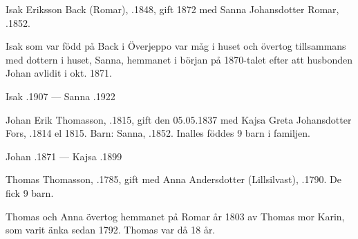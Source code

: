 %
Isak Eriksson Back (Romar), .1848, gift 1872 med Sanna Johansdotter Romar, .1852.
\begin{jhchildren}
  \item {}
  \item {}
  \item {}
  \item {}
  \item {}
  \item {}
  \item {}
\end{jhchildren}
Isak som var född på Back i Överjeppo var måg i huset och övertog tillsammans med dottern i huset, Sanna, hemmanet i början på 1870-talet efter att husbonden Johan avlidit i okt. 1871.

Isak .1907  ---  Sanna .1922


%
Johan Erik Thomasson, .1815, gift den 05.05.1837 med Kajsa Greta Johansdotter Fors, .1814 el 1815.
Barn: Sanna, .1852. Inalles föddes 9 barn i familjen.

Johan .1871  ---  Kajsa .1899


%
Thomas Thomasson, .1785, gift med Anna Andersdotter (Lillsilvast), .1790. De fick 9 barn.
\begin{jhchildren}
  \item {}
  \item {}
\end{jhchildren}
Thomas och Anna övertog hemmanet på Romar år 1803 av Thomas mor Karin, som varit änka sedan 1792. Thomas var då 18 år.

